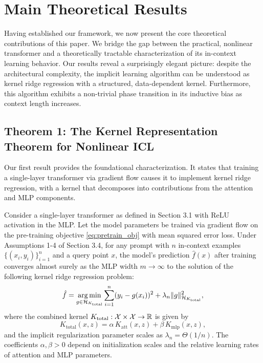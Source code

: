 	\section{Main Theoretical Results}
	\label{sec:main-results}
	
	Having established our framework, we now present the core theoretical contributions of this paper. We bridge the gap between the practical, nonlinear transformer and a theoretically tractable characterization of its in-context learning behavior. Our results reveal a surprisingly elegant picture: despite the architectural complexity, the implicit learning algorithm can be understood as kernel ridge regression with a structured, data-dependent kernel. Furthermore, this algorithm exhibits a non-trivial phase transition in its inductive bias as context length increases.
	
	\subsection{Theorem 1: The Kernel Representation Theorem for Nonlinear ICL}
	\label{subsec:thm1}
	
	Our first result provides the foundational characterization. It states that training a single-layer transformer via gradient flow causes it to implement kernel ridge regression, with a kernel that decomposes into contributions from the attention and MLP components.
	
	\begin{theorem}
		\label{thm:kernel_rep}
		Consider a single-layer transformer as defined in Section 3.1 with ReLU activation in the MLP. Let the model parameters be trained via gradient flow on the pre-training objective \eqref{eq:pretrain_obj} with mean squared error loss. Under Assumptions 1-4 of Section 3.4, for any prompt with \(n\) in-context examples \(\{(x_i, y_i)\}_{i=1}^n\) and a query point \(x\), the model's prediction \(\hat{f}(x)\) after training converges almost surely as the MLP width \(m \to \infty\) to the solution of the following kernel ridge regression problem:
		\begin{equation}
			\hat{f} = \operatorname*{arg\,min}_{g \in \mathcal{H}_{K_{\text{total}}}} \sum_{i=1}^n (y_i - g(x_i))^2 + \lambda_n \lVert g \rVert_{\mathcal{H}_{K_{\text{total}}}}^2,
			\label{eq:kernel_ridge}
		\end{equation}
		where the combined kernel \(K_{\text{total}}: \mathcal{X} \times \mathcal{X} \to \mathbb{R}\) is given by
		\begin{equation}
			K_{\text{total}}(x, z) = \alpha \, K_{\text{att}}(x, z) + \beta \, K_{\text{mlp}}(x, z),
			\label{eq:combined_kernel}
		\end{equation}
		and the implicit regularization parameter scales as \(\lambda_n = \Theta(1/n)\). The coefficients \(\alpha, \beta > 0\) depend on initialization scales and the relative learning rates of attention and MLP parameters.
	\end{theorem}
	
